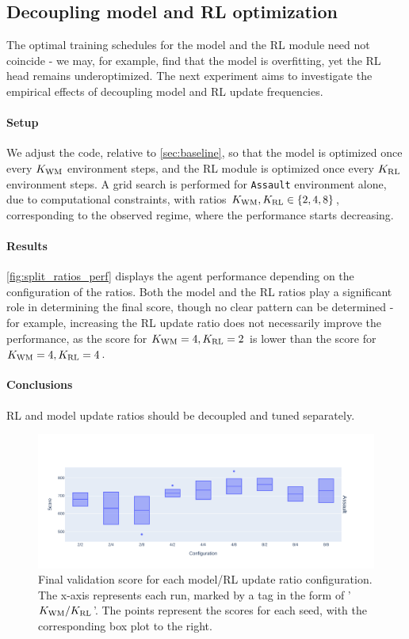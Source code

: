 \documentclass[en]{pracamgr}
\newcommand{\env}[1]{{\tt #1}}
\newcommand{\figurewidth}{\linewidth}
\newcommand{\figureheight}{0.8\paperheight}
\begin{document}
\subsection{Decoupling model and RL optimization}
\label{ssec:decoupled_ratio}

The optimal training schedules for the model and the RL module need not coincide - we may, for example, find that the model is overfitting, yet the RL head remains underoptimized. The next experiment aims to investigate the empirical effects of decoupling model and RL update frequencies.

\paragraph{Setup} We adjust the code, relative to \autoref{sec:baseline}, so that the model is optimized once every $K_{\rm WM}$ environment steps, and the RL module is optimized once every $K_{\rm RL}$ environment steps. A grid search is performed for \env{Assault} environment alone, due to computational constraints, with ratios $K_{\rm WM}, K_{\rm RL} \in \{2, 4, 8\}$, corresponding to the observed regime, where the performance starts decreasing.

\paragraph{Results} \autoref{fig:split_ratios_perf} displays the agent performance depending on the configuration of the ratios. Both the model and the RL ratios play a significant role in determining the final score, though no clear pattern can be determined - for example, increasing the RL update ratio does not necessarily improve the performance, as the score for $K_{\rm WM} = 4, K_{\rm RL} = 2$ is lower than the score for $K_{\rm WM} = 4, K_{\rm RL} = 4$.

\paragraph{Conclusions} RL and model update ratios should be decoupled and tuned separately.

\begin{figure}
  \centering
  \includegraphics[width=\figurewidth,height=\figureheight,keepaspectratio]{assets/split_ratios_perf.pdf}
  \caption{Final validation score for each model/RL update ratio configuration. The x-axis represents each run, marked by a tag in the form of '$K_{\rm WM}/K_{\rm RL}$'. The points represent the scores for each seed, with the corresponding box plot to the right.}
  \label{fig:split_ratios_perf}
\end{figure}
\end{document}
